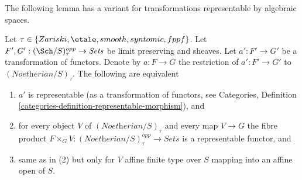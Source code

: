 \noindent
The following lemma has a variant for transformations
representable by algebraic spaces.

\begin{lemma}
\label{lemma-representable}
Let $\tau \in \{Zariski, \etale, smooth, syntomic, fppf\}$.
Let $F', G' : (\Sch/S)_\tau^{opp} \to \textit{Sets}$ be limit preserving
and sheaves. Let $a' : F' \to G'$ be a transformation of functors.
Denote by $a : F \to G$ the restriction of $a' : F' \to G'$ to
$(\textit{Noetherian}/S)_\tau$. The following are equivalent
\begin{enumerate}
\item $a'$ is representable (as a transformation of functors, see
Categories, Definition \ref{categories-definition-representable-morphism}), and
\item for every object $V$ of $(\textit{Noetherian}/S)_\tau$
and every map $V \to G$ the fibre product
$F \times_G V : (\textit{Noetherian}/S)_\tau^{opp} \to \textit{Sets}$
is a representable functor, and
\item same as in (2) but only for $V$ affine finite type over $S$
mapping into an affine open of $S$.
\end{enumerate}
\end{lemma}

